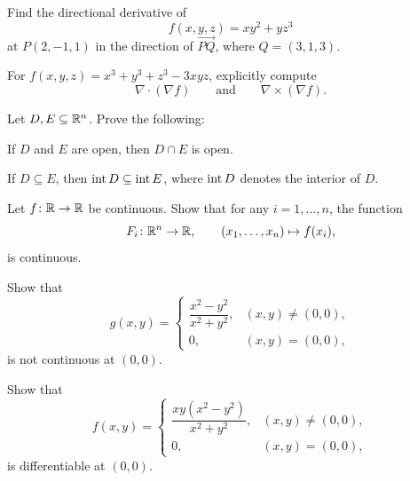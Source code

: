 \begin{problem}
Find the directional derivative of
\[
f(x, y, z)=xy^2+yz^3
\]
at $P(2, -1, 1)$ in the direction of $\overrightarrow{PQ}$, where $Q=(3, 1, 3)$.
\end{problem}

\begin{problem}
For $f(x, y, z)=x^3+y^3+z^3-3xyz$, explicitly compute
\[
\nabla\cdot(\nabla f)
\qquad\text{and}\qquad
\nabla\times(\nabla f).
\]
\end{problem}

\begin{problem}
Let $D, E\subseteq\mathbb{R}^n$. Prove the following:
\begin{problemsubparts}
\item If $D$ and $E$ are open, then $D\cap E$ is open.
\item If $D\subseteq E$, then $\operatorname{int} D\subseteq\operatorname{int} E$, where $\operatorname{int} D$ denotes the interior of $D$.
\end{problemsubparts}
\end{problem}

\begin{problem}
Let $f\colon\mathbb{R}\to\mathbb{R}$ be continuous. Show that for any $i=1, \ldots, n$, the function
\[
F_i\colon\mathbb{R}^n\to\mathbb{R},
\qquad
(x_1, \ldots, x_n)\mapsto f(x_i),
\]
is continuous.
\end{problem}

\begin{problem}
\begin{problemsubparts}
\item Show that
\[
g(x, y)
=
\begin{cases}
\dfrac{x^2-y^2}{x^2+y^2}, & (x, y)\ne(0, 0), \\[0.6em]
0, & (x, y)=(0, 0),
\end{cases}
\]
is not continuous at $(0, 0)$.
\item Show that
\[
f(x, y)
=
\begin{cases}
\dfrac{xy(x^2-y^2)}{x^2+y^2}, & (x, y)\ne(0, 0), \\[0.6em]
0, & (x, y)=(0, 0),
\end{cases}
\]
is differentiable at $(0, 0)$.
\end{problemsubparts}
\end{problem}

